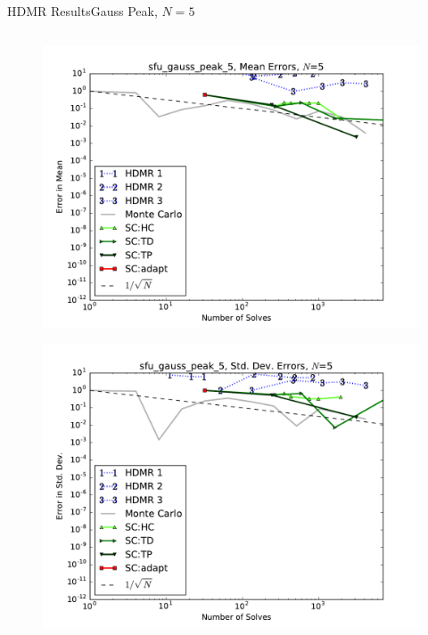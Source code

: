 \documentclass{beamer}
\begin{document}
\begin{frame}{HDMR Results}{Gauss Peak, $N=5$}
\begin{columns}
\begin{column}{0.5\textwidth}
\begin{figure}[h!]
          \includegraphics[width=0.8\linewidth]{anlmodels/sfu_gauss_peak_5_mean_errs}
        \end{figure}
        \vspace{-20pt}
        \begin{figure}[h!]
          \centering
          \includegraphics[width=0.8\linewidth]{anlmodels/sfu_gauss_peak_5_variance_errs}
        \end{figure}
   \end{column}
 \end{columns}
\end{frame}
\end{document}
